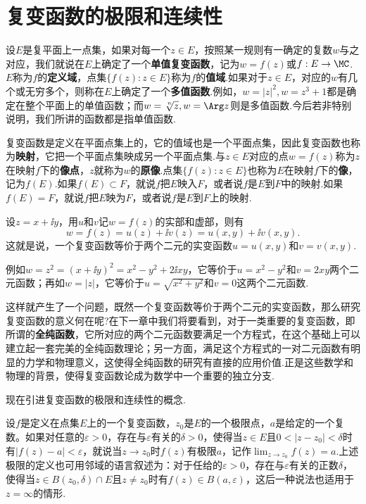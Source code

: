 \section{复变函数的极限和连续性\label{sec1.7}}
设$E$是复平面上一点集，如果对每一个$z\in E$，按照某一规则有一确定的复数$w$与之对应，我们就说在$E$上确定了一个\textbf{单值复变函数}，记为$w=f(z)$或$f:E\to\MC$. $E$称为$f$的\textbf{定义域}，点集$\{f(z):z\in E\}$称为$f$的\textbf{值域}.如果对于$z\in E$，对应的$w$有几个或无穷多个，则称在$E$上确定了一个\textbf{多值函数}.例如，$w=|z|^2,w=z^3+1$都是确定在整个平面上的单值函数；而$w=\sqrt[\leftroot{-1}\uproot{2} n]z,w=\Arg z$则是多值函数.今后若非特别说明，我们所讲的函数都是指单值函数.

复变函数是定义在平面点集上的，它的值域也是一个平面点集，因此复变函数也称为\textbf{映射}，它把一个平面点集映成另一个平面点集.与$z\in E$对应的点$w=f(z)$称为$z$在映射$f$下的\textbf{像点}，$z$就称为$w$的\textbf{原像}.点集$\{f(z):z\in E\}$也称为$E$在映射$f$下的\textbf{像}，记为$f(E)$.如果$f(E)\subset F$，就说$f$把$E$映入$F$，或者说$f$是$E$到$F$中的映射.如果$f(E)=F$，就说$f$把$E$映为$F$，或者说$f$是$E$到$F$上的映射.

设$z=x+\ii y$，用$u$和$v$记$w=f(z)$的实部和虚部，则有
\[w=f(z)=u(z)+\ii v(z)=u(x,y)+\ii v(x,y).\]
这就是说，一个复变函数等价于两个二元的实变函数$u=u(x,y)$和$v=v(x,y)$.

例如$w=z^2=(x+\ii y)^2=x^2-y^2+2\ii xy$，它等价于$u=x^2-y^2$和$v=2xy$两个二元函数；再如$w=|z|$，它等价于$u=\sqrt{x^2+y^2}$和$v=0$这两个二元函数.

这样就产生了一个问题，既然一个复变函数等价于两个二元的实变函数，那么研究复变函数的意义何在呢?在下一章中我们将要看到，对于一类重要的复变函数，即所谓的\textbf{全纯函数}，它所对应的两个二元函数要满足一个方程式，在这个基础上可以建立起一套完美的全纯函数理论；另一方面，满足这个方程式的一对二元函数有明显的力学和物理意义，这使得全纯函数的研究有直接的应用价值.正是这些数学和物理的背景，使得复变函数论成为数学中一个重要的独立分支.

现在引进复变函数的极限和连续性的概念.

设$f$是定义在点集$E$上的一个复变函数，$z_0$是$E$的一个极限点，$a$是给定的一个复数。如果对任意的$\varepsilon>0$，存在与$\varepsilon$有关的$\delta>0$，使得当$z\in E$且$0<|z-z_0|<\delta$时有$|f(z)-a|<\varepsilon$，就说当$z\to z_0$时$f(z)$有极限$a$，记作$\lim_{z\to z_0}f(z)=a$.上述极限的定义也可用邻域的语言叙述为：对于任给的$\varepsilon>0$，存在与$\varepsilon$有关的正数$\delta$，使得当$z\in B(z_0,\delta)\cap E$且$z\ne z_0$时有$f(z)\in B(a,\varepsilon)$，这后一种说法也适用于$z=\infty$的情形.

